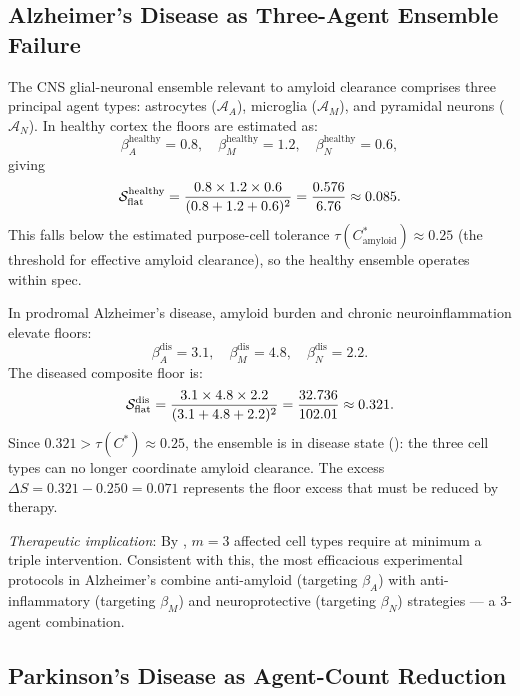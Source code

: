\subsection{Alzheimer's Disease as Three-Agent Ensemble Failure}

\begin{example}
\label{ex:ch02b-alzheimer}
The CNS glial-neuronal ensemble relevant to amyloid clearance comprises three
principal agent types: astrocytes ($\mathcal{A}_A$), microglia ($\mathcal{A}_M$),
and pyramidal neurons ($\mathcal{A}_N$).  In healthy cortex the floors are
estimated as:
\[
  \beta_A^{\mathrm{healthy}} = 0.8,\quad
  \beta_M^{\mathrm{healthy}} = 1.2,\quad
  \beta_N^{\mathrm{healthy}} = 0.6,
\]
giving
\[
  \mathcal{S}_{\mathrm{flat}}^{\mathrm{healthy}}
  = \frac{0.8 \times 1.2 \times 0.6}{(0.8+1.2+0.6)^{2}}
  = \frac{0.576}{6.76}
  \approx 0.085.
\]
This falls below the estimated purpose-cell tolerance
$\tau(C^*_{\mathrm{amyloid}}) \approx 0.25$ (the threshold for effective
amyloid clearance), so the healthy ensemble operates within spec.

In prodromal Alzheimer's disease, amyloid burden and chronic neuroinflammation
elevate floors:
\[
  \beta_A^{\mathrm{dis}} = 3.1,\quad
  \beta_M^{\mathrm{dis}} = 4.8,\quad
  \beta_N^{\mathrm{dis}} = 2.2.
\]
The diseased composite floor is:
\[
  \mathcal{S}_{\mathrm{flat}}^{\mathrm{dis}}
  = \frac{3.1 \times 4.8 \times 2.2}{(3.1+4.8+2.2)^{2}}
  = \frac{32.736}{102.01}
  \approx 0.321.
\]
Since $0.321 > \tau(C^*) \approx 0.25$, the ensemble is in disease state
(): the three cell types can no longer
coordinate amyloid clearance.  The excess $\Delta S = 0.321 - 0.250 = 0.071$
represents the floor excess that must be reduced by therapy.

\emph{Therapeutic implication}: By , $m = 3$
affected cell types require at minimum a triple intervention.  Consistent with
this, the most efficacious experimental protocols in Alzheimer's combine
anti-amyloid (targeting $\beta_A$) with anti-inflammatory (targeting $\beta_M$)
and neuroprotective (targeting $\beta_N$) strategies — a 3-agent combination.
\end{example}

\subsection{Parkinson's Disease as Agent-Count Reduction}

